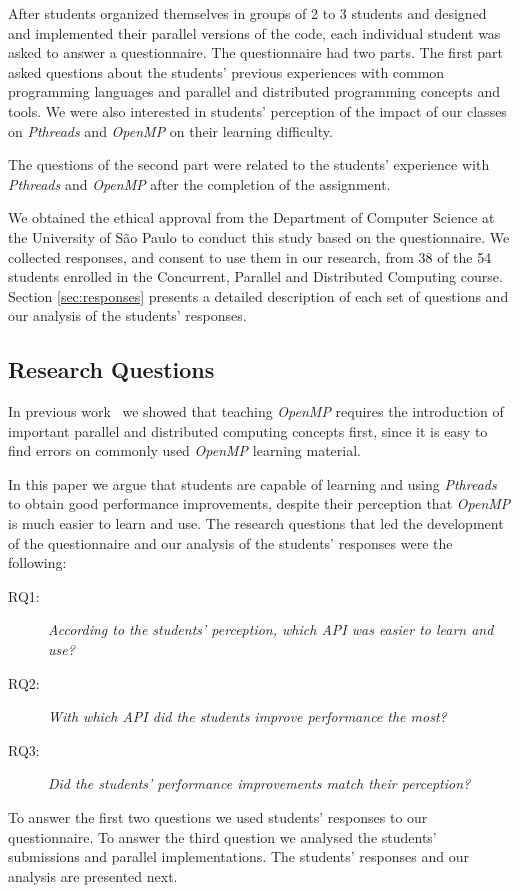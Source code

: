 After students organized themselves in groups of 2 to 3 students and designed
and implemented their parallel versions of the code, each individual student
was asked to answer a questionnaire. The questionnaire had two parts. The first
part asked questions about the students' previous experiences with common
programming languages and parallel and distributed programming concepts and
tools. We were also interested in students' perception of the impact of our
classes on \textit{Pthreads} and \textit{OpenMP} on their learning difficulty.

The questions of the second part were related to the students'
experience with \textit{Pthreads} and \textit{OpenMP} after
the completion of the assignment.

We obtained the ethical approval from the Department of Computer Science at the
University of São Paulo to conduct this study based on the questionnaire. We
collected responses, and consent to use them in our research, from 38 of the 54
students enrolled in the Concurrent, Parallel and Distributed Computing course.
Section \ref{sec:responses} presents a detailed description of each set of
questions and our analysis of the students' responses.

\subsection{Research Questions}
\label{sec:resques}

In previous work~\cite{goncalves:OpenMPNotEasy} we showed that teaching
\textit{OpenMP} requires the introduction of important parallel and distributed
computing concepts first, since it is easy to find errors on commonly used
\textit{OpenMP} learning material.

In this paper we argue that students are capable of learning and using
\textit{Pthreads} to obtain good performance improvements, despite their
perception that \textit{OpenMP} is much easier to learn and use.
The research questions that led the development of the questionnaire
and our analysis of the students' responses were the following:

\begin{description}
    \item[RQ1:] \textit{According to the students' perception, which API was
        easier to learn and use?}
    \item[RQ2:] \textit{With which API did the students improve performance the
        most?}
    \item[RQ3:] \textit{Did the students' performance improvements match their
        perception?}
\end{description}

To answer the first two questions we used students' responses to
our questionnaire. To answer the third question we analysed the
students' submissions and parallel implementations. The
students' responses and our analysis are presented next.
